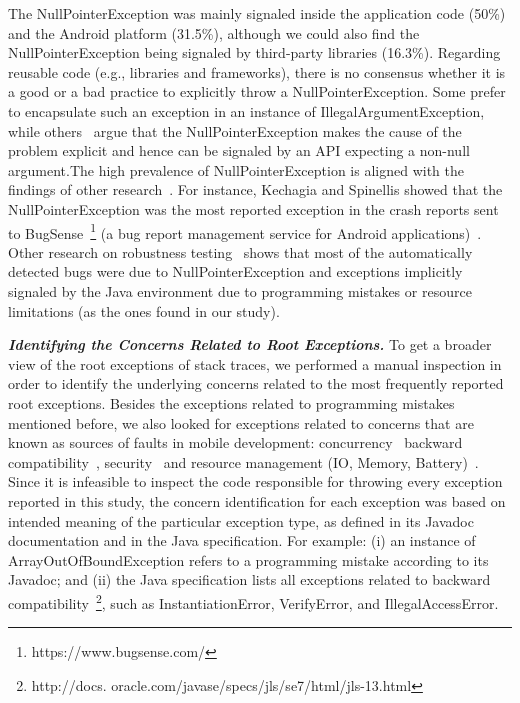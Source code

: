  The NullPointerException was mainly signaled inside the application code (50\%) and the Android platform (31.5\%),
 although we could also find the NullPointerException being signaled by third-party libraries (16.3\%). 
Regarding reusable code (e.g., libraries and frameworks), there is no consensus whether it is a good or a bad practice to 
explicitly throw a NullPointerException. Some prefer to encapsulate such an exception in
an instance of IllegalArgumentException, while others~\cite{bloch2008effective} argue that the
NullPointerException makes the cause of the problem explicit and hence 
can be signaled by an API expecting a non-null argument.The high prevalence of NullPointerException is aligned with the
findings of other 
research~\cite{kim2013predicting,fraser20131600,csallner2004jcrasher,kechagia2014}. 
For instance, Kechagia and Spinellis showed that the NullPointerException was the  
most reported exception in the crash reports sent to BugSense~\footnote{https://www.bugsense.com/} (a bug report 
management service for Android applications)~\cite{kechagia2014}.
Other research on robustness testing~\cite{maji2012empirical,csallner2004jcrasher} shows that most of the automatically 
detected bugs were due to NullPointerException and exceptions
implicitly signaled by the Java 
environment due to programming mistakes or resource limitations
 (as the ones found in our study).


\emph{\textbf{Identifying the Concerns Related to Root Exceptions.}} To get a broader view of the root exceptions of stack traces,
we performed a manual inspection in order to identify the underlying
concerns related to the most frequently reported root exceptions.
Besides the exceptions related to programming mistakes mentioned before, we also looked for exceptions related to concerns that are known as sources of faults in mobile development: concurrency~\cite{ama2012} backward compatibility~\cite{McDon13}, security~\cite{enck2011study,was2010} and resource management (IO, Memory, Battery)~\cite{Zhang12}. Since it is infeasible to inspect the code responsible for throwing every exception reported in this study,
the concern identification for each exception was based on intended
meaning of the particular exception type, as defined in 
its Javadoc documentation and in the Java specification. 
For example: (i) an instance of ArrayOutOfBoundException  
refers to a programming mistake according to its Javadoc; and (ii) the Java specification lists all 
exceptions related to backward compatibility~\footnote{http://docs. oracle.com/javase/specs/jls/se7/html/jls-13.html}, such as
InstantiationError, VerifyError, and IllegalAccessError.

